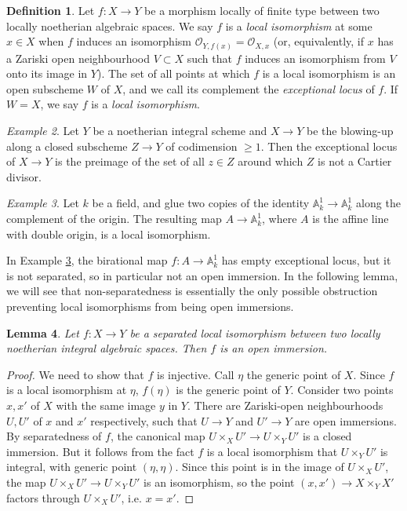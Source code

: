 \documentclass[a4paper,12pt]{amsart} %
\numberwithin{equation}{subsection}
\theoremstyle{definition}
\newtheorem{definition}{Definition}[section]
\theoremstyle{plain}%
\newtheorem{lemma}[definition]{Lemma}
\theoremstyle{remark}
\newtheorem{example}[definition]{Example}
\renewcommand{\O}{\mathcal{O}}
\begin{document}
\begin{definition}
Let $f:X\to Y$ be a morphism locally of finite type between two locally noetherian algebraic spaces. We say $f$ is a \emph{local isomorphism} at some $x\in X$ when $f$ induces an isomorphism $\O_{Y,f(x)}=\O_{X,x}$ (or, equivalently, if $x$ has a Zariski open neighbourhood $V\subset X$ such that $f$ induces an isomorphism from $V$ onto its image in $Y$). The set of all points at which $f$ is a local isomorphism is an open subscheme $W$ of $X$, and we call its complement the \emph{exceptional locus} of $f$. If $W=X$, we say $f$ is a \emph{local isomorphism}.
\end{definition}

\begin{example}
Let $Y$ be a noetherian integral scheme and $X\rightarrow Y$ be the blowing-up along a closed subscheme $Z\rightarrow Y$ of codimension $\geq 1$. Then the exceptional locus of $X\rightarrow Y$ is the preimage of the set of all $z\in Z$ around which $Z$ is not a Cartier divisor.
\end{example}

\begin{example}\label{example local iso but not open immersion}
Let $k$ be a field, and glue two copies of the identity $\mathbb{A}_k^1\rightarrow \mathbb{A}_k^1$ along the complement of the origin. The resulting map $A\rightarrow \mathbb{A}_k^1$, where $A$ is the affine line with double origin, is a local isomorphism.
\end{example}

In Example \ref{example local iso but not open immersion}, the birational map $f\colon A \rightarrow \mathbb{A}_k^1$ has empty exceptional locus, but it is not separated, so in particular not an open immersion. In the following lemma, we will see that non-separatedness is essentially the only possible obstruction preventing local isomorphisms from being open immersions.

\begin{lemma}\label{lemme un iso local separe est une immersion ouverte}
Let $f\colon X\to Y$ be a separated local isomorphism between two locally noetherian integral algebraic spaces. Then $f$ is an open immersion.
\end{lemma}

\begin{proof}
We need to show that $f$ is injective. Call $\eta$ the generic point of $X$. Since $f$ is a local isomorphism at $\eta$, $f(\eta)$ is the generic point of $Y$. Consider two points $x,x'$ of $X$ with the same image $y$ in $Y$. There are Zariski-open neighbourhoods $U,U'$ of $x$ and $x'$ respectively, such that $U \to Y$ and $U'\to Y$ are open immersions. By separatedness of $f$, the canonical map $U\times_X U'\to U\times_Y U'$ is a closed immersion. But it follows from the fact $f$ is a local isomorphism that $U\times_Y U'$ is integral, with generic point $(\eta,\eta)$. Since this point is in the image of $U\times_X U'$, the map $U\times_X U'\to U\times_Y U'$ is an isomorphism, so the point $(x,x')\to X\times_Y X'$ factors through $U\times_X U'$, i.e. $x=x'$.
\end{proof}
\end{document}
